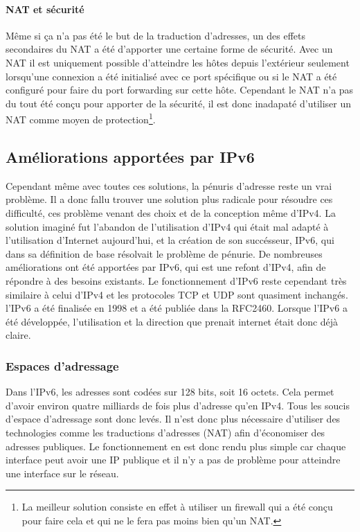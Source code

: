 \paragraph{NAT et sécurité}
Même si ça n'a pas été le but de la traduction d'adresses, un des effets
secondaires du NAT a été d'apporter une certaine forme de sécurité.  Avec un
NAT il est uniquement possible d'atteindre les hôtes depuis l'extérieur
seulement lorsqu'une connexion a été initialisé avec ce port spécifique ou si
le NAT a été configuré pour faire du port forwarding sur cette hôte.  Cependant
le NAT n'a pas du tout été conçu pour apporter de la sécurité, il est donc
inadapaté d'utiliser un NAT comme moyen de protection\footnote{
La meilleur solution consiste en effet à utiliser un firewall qui a été conçu pour faire cela
et qui ne le fera pas moins bien qu'un NAT.}.

\subsection{Améliorations apportées par IPv6}

Cependant même avec toutes ces solutions, la pénuris d'adresse reste un vrai
problème. Il a donc fallu trouver une solution plus radicale pour résoudre ces
difficulté, ces problème venant des choix et de la conception même d'IPv4.  La
solution imaginé fut l'abandon de l'utilisation d'IPv4 qui était mal adapté à
l'utilisation d'Internet aujourd'hui, et la création de son succésseur, IPv6,
qui dans sa définition de base résolvait le problème de pénurie.
\smallbreak
De nombreuses améliorations ont été apportées par IPv6, qui est une refont
d'IPv4, afin de répondre à des besoins existants. Le fonctionnement d'IPv6
reste cependant très similaire à celui d'IPv4 et les protocoles TCP et UDP sont
quasiment inchangés.  l'IPv6 a été finalisée en 1998 et a été publiée dans la
RFC2460. Lorsque l'IPv6 a été développée, l'utilisation et la direction que
prenait internet était donc déjà claire. 

\subsubsection{Espaces d'adressage}
Dans l'IPv6, les adresses sont codées sur 128 bits, soit 16 octets. Cela permet
d'avoir environ quatre milliards de fois plus d'adresse qu'en IPv4. Tous les
soucis d'espace d'adressage sont donc levés. Il n'est donc plus nécessaire
d'utiliser des technologies comme les traductions d'adresses (NAT) afin
d'économiser des adresses publiques. Le fonctionnement en est donc rendu plus
simple car chaque interface peut avoir une IP publique et il n'y a pas de
problème pour atteindre une interface sur le réseau.

